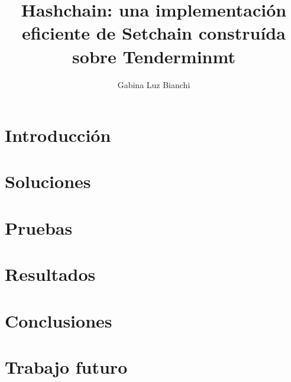 \documentclass[12pt, oneside]{book}
\title{Hashchain: una implementación eficiente de Setchain construída sobre Tenderminmt}
\author{Gabina Luz Bianchi}
\begin{document}
\maketitle



\tableofcontents{}

\chapter{Introducción}





\chapter{Soluciones}


\chapter{Pruebas}

\chapter{Resultados}

\chapter{Conclusiones}

\chapter{Trabajo futuro}






% 




% 


% 


% 



% 
\end{document}
